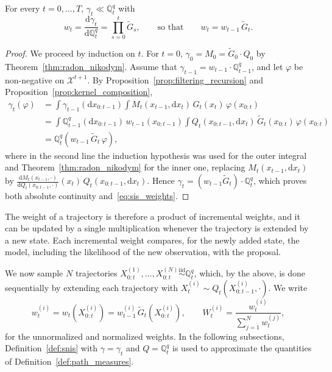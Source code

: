 \begin{proposition}
    \label{prop:sis_weights}
    For every $t=0,\ldots,T$, $\gamma_t\ll\mathbb{Q}^q_t$ with
    \begin{equation}
        w_t = \frac{\mathrm{d}\gamma_t}{\mathrm{d}\mathbb{Q}^q_t} = \prod_{s=0}^{t}\tilde{G}_s, \qquad\text{so that}\qquad w_t = w_{t-1}\,\tilde{G}_t.
        \label{eq:sis_weights}
    \end{equation}
\end{proposition}
\begin{proof}
    We proceed by induction on $t$. For $t=0$, $\gamma_0 = M_0 = \tilde{G}_0\cdot Q_0$ by Theorem~\ref{thm:radon_nikodym}. Assume that $\gamma_{t-1} = w_{t-1}\cdot\mathbb{Q}^q_{t-1}$, and let $\varphi$ be non-negative on $\mathcal{X}^{t+1}$. By Proposition~\ref{prop:filtering_recursion} and Proposition~\ref{prop:kernel_composition},
    \begin{align}
        \gamma_t(\varphi) &= \int\gamma_{t-1}(\mathrm{d}x_{0:t-1})\int M_t(x_{t-1},\mathrm{d}x_t)\,G_t(x_t)\,\varphi(x_{0:t}) \\
        &= \int\mathbb{Q}^q_{t-1}(\mathrm{d}x_{0:t-1})\,w_{t-1}(x_{0:t-1})\int Q_t(x_{0:t-1},\mathrm{d}x_t)\,\tilde{G}_t(x_{0:t})\,\varphi(x_{0:t}) \\
        &= \mathbb{Q}^q_t\left(w_{t-1}\,\tilde{G}_t\,\varphi\right),
    \end{align}
    where in the second line the induction hypothesis was used for the outer integral and Theorem~\ref{thm:radon_nikodym} for the inner one, replacing $M_t(x_{t-1},\mathrm{d}x_t)$ by $\frac{\mathrm{d}M_t(x_{t-1},\cdot)}{\mathrm{d}Q_t(x_{0:t-1},\cdot)}(x_t)\,Q_t(x_{0:t-1},\mathrm{d}x_t)$. Hence $\gamma_t = (w_{t-1}\tilde{G}_t)\cdot\mathbb{Q}^q_t$, which proves both absolute continuity and~\eqref{eq:sis_weights}.
\end{proof}

The weight of a trajectory is therefore a product of incremental weights, and it can be updated by a single multiplication whenever the trajectory is extended by a new state. Each incremental weight compares, for the newly added state, the model, including the likelihood of the new observation, with the proposal.

We now sample $N$ trajectories $X_{0:t}^{(1)},\ldots,X_{0:t}^{(N)}\overset{\mathrm{iid}}{\sim}\mathbb{Q}^q_t$, which, by the above, is done sequentially by extending each trajectory with $X_t^{(i)}\sim Q_t(X_{0:t-1}^{(i)},\cdot)$. We write
\begin{equation}
    w_t^{(i)} = w_t(X_{0:t}^{(i)}) = w_{t-1}^{(i)}\,\tilde{G}_t(X_{0:t}^{(i)}), \qquad
    W_t^{(i)} = \frac{w_t^{(i)}}{\sum_{j=1}^{N}w_t^{(j)}},
\end{equation}
for the unnormalized and normalized weights. In the following subsections, Definition~\ref{def:snis} with $\gamma = \gamma_t$ and $Q = \mathbb{Q}^q_t$ is used to approximate the quantities of Definition~\ref{def:path_measures}.

